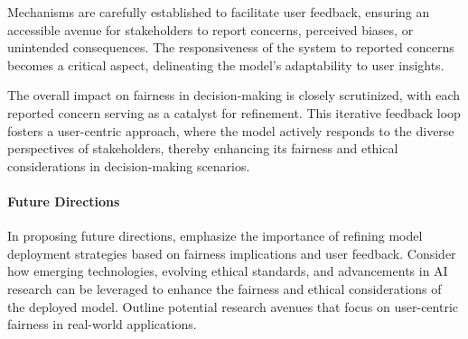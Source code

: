 Mechanisms are carefully established to facilitate user feedback, ensuring an accessible avenue for stakeholders to report concerns, perceived biases, or unintended consequences. The responsiveness of the system to reported concerns becomes a critical aspect, delineating the model's adaptability to user insights.

The overall impact on fairness in decision-making is closely scrutinized, with each reported concern serving as a catalyst for refinement. This iterative feedback loop fosters a user-centric approach, where the model actively responds to the diverse perspectives of stakeholders, thereby enhancing its fairness and ethical considerations in decision-making scenarios.

\paragraph{Future Directions}

In proposing future directions, emphasize the importance of refining model deployment strategies based on fairness implications and user feedback. Consider how emerging technologies, evolving ethical standards, and advancements in AI research can be leveraged to enhance the fairness and ethical considerations of the deployed model. Outline potential research avenues that focus on user-centric fairness in real-world applications.


